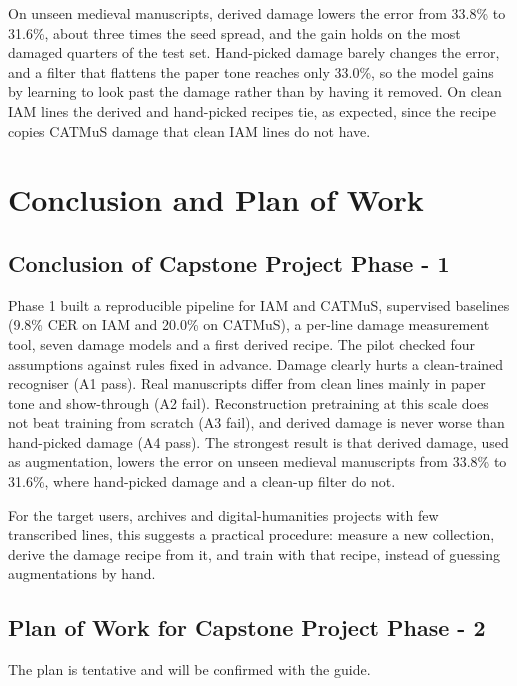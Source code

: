 \documentclass[
  12pt,
  a4paper,
]{report}
\begin{document}
On unseen medieval manuscripts, derived damage lowers the error from
33.8\% to 31.6\%, about three times the seed spread, and the gain holds
on the most damaged quarters of the test set. Hand-picked damage barely
changes the error, and a filter that flattens the paper tone reaches
only 33.0\%, so the model gains by learning to look past the damage
rather than by having it removed. On clean IAM lines the derived and
hand-picked recipes tie, as expected, since the recipe copies CATMuS
damage that clean IAM lines do not have.

\chapter{Conclusion and Plan of Work}\label{conclusion-and-plan-of-work}

\section{Conclusion of Capstone Project Phase -
1}\label{conclusion-of-capstone-project-phase---1}

Phase 1 built a reproducible pipeline for IAM and CATMuS, supervised
baselines (9.8\% CER on IAM and 20.0\% on CATMuS), a per-line damage
measurement tool, seven damage models and a first derived recipe. The
pilot checked four assumptions against rules fixed in advance. Damage
clearly hurts a clean-trained recogniser (A1 pass). Real manuscripts
differ from clean lines mainly in paper tone and show-through (A2 fail).
Reconstruction pretraining at this scale does not beat training from
scratch (A3 fail), and derived damage is never worse than hand-picked
damage (A4 pass). The strongest result is that derived damage, used as
augmentation, lowers the error on unseen medieval manuscripts from
33.8\% to 31.6\%, where hand-picked damage and a clean-up filter do not.

For the target users, archives and digital-humanities projects with few
transcribed lines, this suggests a practical procedure: measure a new
collection, derive the damage recipe from it, and train with that
recipe, instead of guessing augmentations by hand.

\section{Plan of Work for Capstone Project Phase -
2}\label{plan-of-work-for-capstone-project-phase---2}

The plan is tentative and will be confirmed with the guide.
\end{document}
